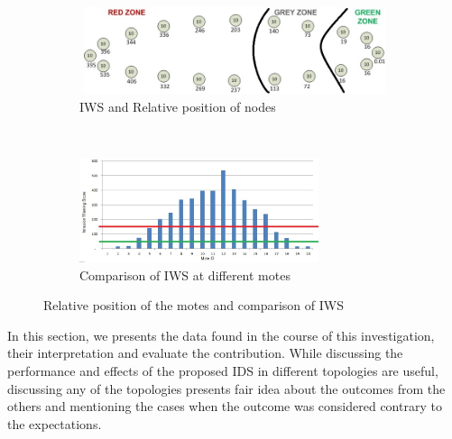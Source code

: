 \documentclass[conference]{IEEEtran}
\newcommand{\notedme}[1]{\raisebox{0pt}[0pt][0pt]{\pdfcomment[open=true,color=blue]{#1}}}
\begin{document}
\begin{figure}[t!]
    \centering
    \begin{subfigure}[b]{0.5\textwidth}
        \centering
        \includegraphics[height=1in, width=4in]{Elliptical}
        \caption{IWS and Relative position of nodes}
        \label{subfig:elliptopo} %
    \end{subfigure}%
    ~ 
    \begin{subfigure}[b]{0.5\textwidth}
        \centering
        \includegraphics[height=1.2in]{Elliptical_column}
        \caption{Comparison of IWS at different motes}
        \label{subfig:ellipgraph} %
    \end{subfigure}
    \caption{Relative position of the motes and comparison of IWS }
    \label{fig:ellip} %
\end{figure}

In this section, we presents the data found in the course of this investigation, their interpretation and evaluate the contribution.
While discussing the performance and effects of the proposed IDS in different topologies are useful, discussing any of the topologies presents fair idea about the outcomes from the others and mentioning the cases when the outcome was considered  contrary to the expectations.


\end{document}

